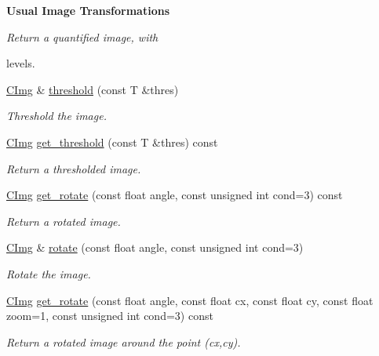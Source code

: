 \begin{Indent}{\bf Usual Image Transformations}
\begin{DoxyCompactItemize}
\begin{DoxyCompactList}\small\item\em Return a quantified image, with \par
 levels. \item\end{DoxyCompactList}\item 
\hyperlink{structcimg__library_1_1_c_img}{CImg} \& \hyperlink{structcimg__library_1_1_c_img_ae98d5f595dd43b98a38fda8ee279d469}{threshold} (const T \&thres)
\begin{DoxyCompactList}\small\item\em Threshold the image. \item\end{DoxyCompactList}\item 
\hyperlink{structcimg__library_1_1_c_img}{CImg} \hyperlink{structcimg__library_1_1_c_img_a80cd02a15494653e88c9c91e02dfebca}{get\_\-threshold} (const T \&thres) const 
\begin{DoxyCompactList}\small\item\em Return a thresholded image. \item\end{DoxyCompactList}\item 
\hyperlink{structcimg__library_1_1_c_img}{CImg} \hyperlink{structcimg__library_1_1_c_img_aaa91237f26c67cf66f6eda7c415f78ae}{get\_\-rotate} (const float angle, const unsigned int cond=3) const 
\begin{DoxyCompactList}\small\item\em Return a rotated image. \item\end{DoxyCompactList}\item 
\hyperlink{structcimg__library_1_1_c_img}{CImg} \& \hyperlink{structcimg__library_1_1_c_img_a49cf43e728c25716e3882fc6968552c1}{rotate} (const float angle, const unsigned int cond=3)
\begin{DoxyCompactList}\small\item\em Rotate the image. \item\end{DoxyCompactList}\item 
\hyperlink{structcimg__library_1_1_c_img}{CImg} \hyperlink{structcimg__library_1_1_c_img_a9f0fe40ff2240e2ef3805e3884c790a2}{get\_\-rotate} (const float angle, const float cx, const float cy, const float zoom=1, const unsigned int cond=3) const 
\begin{DoxyCompactList}\small\item\em Return a rotated image around the point ({\ttfamily cx},{\ttfamily cy}). \item\end{DoxyCompactList}\item 

\end{DoxyCompactItemize}
\end{Indent}
